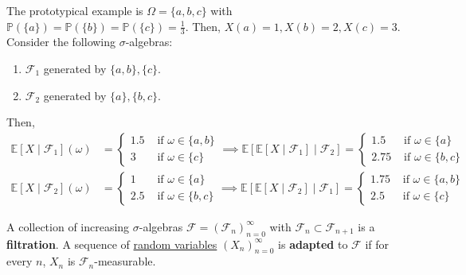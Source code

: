 	\begin{example}
	  \label{ex:filtrations-on-a-three-point-space}
		The prototypical example is $\Omega = \{a, b, c\}$ with $\mathbb{P}(\{a\}) = \mathbb{P}(\{b\}) = \mathbb{P}(\{c\}) = \frac{1}{3}$. Then, $X(a) = 1, X(b) = 2, X(c) = 3$. Consider the following $\sigma$-algebras: 
		\begin{enumerate}
			\item $\mathscr{F}_1$ generated by $\{a, b\}, \{c\}$. 
			\item $\mathscr{F}_2$ generated by $\{a\}, \{b, c\}$. 
		\end{enumerate}
		Then, 
		\begin{align}
			\mathbb{E}[X \mid \mathscr{F}_1](\omega) & = \begin{cases} 
				1.5 & \text{ if } \omega \in \{a, b\} \\ 
				3 & \text{ if } \omega \in \{c\} 
			\end{cases} \implies \mathbb{E}[ \mathbb{E}[X \mid \mathscr{F}_1] \mid \mathscr{F}_2] = 
			\begin{cases} 
				1.5 & \text{ if } \omega \in \{a\} \\ 
				2.75 & \text{ if } \omega \in \{b, c\} 
			\end{cases} \\ 
			\mathbb{E}[X \mid \mathscr{F}_2](\omega) & = \begin{cases} 
				1 & \text{ if } \omega \in \{a\} \\ 
				2.5 & \text{ if } \omega \in \{b, c\} 
			\end{cases} \implies \mathbb{E}[ \mathbb{E}[X \mid \mathscr{F}_2] \mid \mathscr{F}_1] = 
			\begin{cases} 
				1.75 & \text{ if } \omega \in \{a, b\} \\ 
				2.5 & \text{ if } \omega \in \{c\} 
			\end{cases}
		\end{align}
	\end{example}

	\begin{definition}[Filtration]
	  \label{def:filtration-2}
		A collection of increasing $\sigma$-algebras $\mathscr{F} = (\mathscr{F}_n)_{n=0}^\infty$ with $\mathscr{F}_n \subset \mathscr{F}_{n+1}$ is a \textbf{filtration}. A sequence of \hyperref[def:random-variable]{random variables} $(X_n)_{n=0}^\infty$ is \textbf{adapted} to $\mathscr{F}$ if for every $n$, $X_n$ is $\mathscr{F}_n$-measurable. 
	\end{definition}

